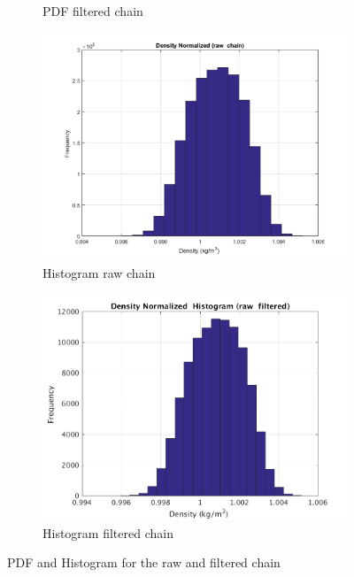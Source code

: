 \documentclass{article}
\begin{document}
\begin{figure}[H]
\begin{center}
\begin{subfigure}{0.4\textwidth}
    \caption{\centering PDF filtered chain}
  \end{subfigure}
  \begin{subfigure}{0.4\textwidth}
    \centering\includegraphics[width=1.1\textwidth,keepaspectratio]{images/inverse_problem/infer_radius/drag_125/range_short/density_histogram_raw.png}
    \caption{\centering Histogram raw chain}
  \end{subfigure}
  \begin{subfigure}{0.4\textwidth}
    \centering\includegraphics[width=1.1\textwidth,keepaspectratio]{images/inverse_problem/infer_radius/drag_125/range_short/density_histogram_filtered.png}
    \caption{\centering Histogram filtered chain}
  \end{subfigure}

\caption{PDF and Histogram for the raw and filtered chain}
\label{fig:raw_filtered} 
 \end{center}
\end{figure}
\end{document}

